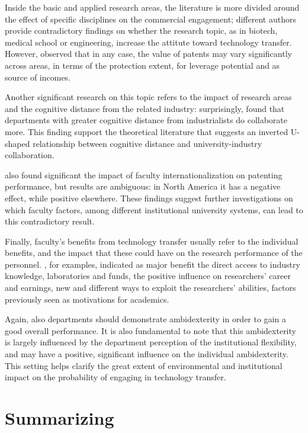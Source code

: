 Inside the basic and applied research areas, the literature is more divided around the effect of specific disciplines on the commercial engagement; different authors provide contradictory findings on whether the research topic, as in biotech, medical school or engineering, increase the attitute toward technology transfer. However, \citet{OwenSmith2001} observed that in any case, the value of patents may vary significantly across areas, in terms of the protection extent, for leverage potential and as source of incomes. 

Another significant research on this topic refers to the impact of research areas and the cognitive distance from the related industry: surprisingly, \citet{Muscio2010} found that departments with greater cognitive distance from industrialists do collaborate more. This finding support the theoretical literature that suggests an inverted U-shaped relationship between cognitive distance and university-industry collaboration.

\citet{Wong2010} also found significant the impact of faculty internationalization on patenting performance, but results are ambiguous: in North America it has a negative effect, while positive elsewhere. These findings suggest further investigations on which faculty factors, among different institutional university systems, can lead to this contradictory result. 

Finally, faculty's benefits from technology transfer usually refer to the individual benefits, and the impact that these could have on the research performance of the personnel. \citet{Baldini2007}, for examples, indicated as major benefit the direct access to industry knowledge, laboratories and funds, the positive influence on researchers' career and earnings, new and different ways to exploit the researchers' abilities, factors previously seen as motivations for academics.

Again, also departments should demonstrate ambidexterity in order to gain a good overall performance. It is also fundamental to note that this ambidexterity is largely influenced by the department perception of the institutional flexibility, and may have a positive, significant influence on the individual ambidexterity. This setting helps clarify the great extent of environmental and institutional impact on the probability of engaging in technology transfer.

\section{Summarizing}